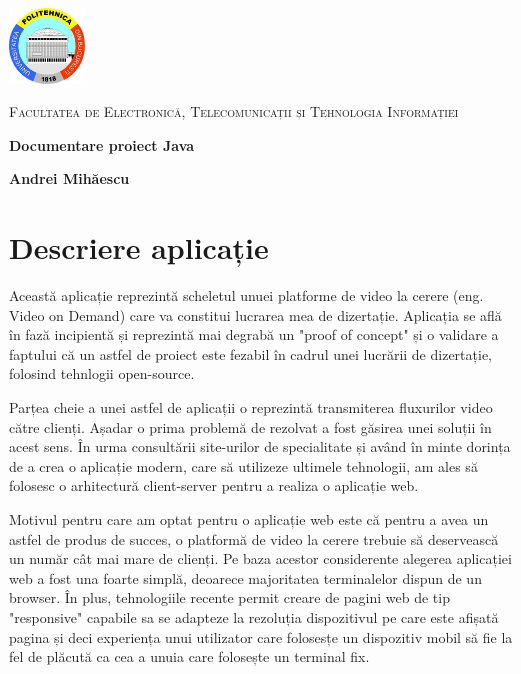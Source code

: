 \documentclass[12pt, a4paper, oneside, romanian]{teza-upb}
\begin{document}
\begin{titlepage}
	\centering
	\includegraphics[width=0.15\textwidth]{img/UPB-logo.png}\par\vspace{1cm}
	{\scshape\LARGE Facultatea de Electronică, Telecomunicații și Tehnologia Informației \par}
	\vspace{1cm}
	{\huge\bfseries Documentare proiect Java\par}
	\vspace{2cm}
	{\Large\bfseries Andrei Mihăescu\par}
	

\end{titlepage}
\newpage

\chapter{Descriere aplicație}	
Această aplicație reprezintă scheletul unuei platforme de video la cerere (eng. Video on Demand) care va constitui lucrarea mea de dizertație. Aplicația se află în fază incipientă și reprezintă mai degrabă un "proof of concept" și o validare a faptului că un astfel de proiect este fezabil în cadrul unei lucrării de dizertație, folosind tehnlogii open-source.

Parțea cheie a unei astfel de aplicații o reprezintă transmiterea fluxurilor video către clienți. Așadar o prima problemă de rezolvat a fost găsirea unei soluții în acest sens. În urma consultării site-urilor de specialitate și având în minte dorința de a crea o aplicație modern, care să utilizeze ultimele tehnologii, am ales să folosesc o arhitectură client-server pentru a realiza o aplicație web. 

Motivul pentru care am optat pentru o aplicație web este că pentru a avea un astfel de produs de succes, o platformă de video la cerere trebuie să deservească un număr cât mai mare de clienți. Pe baza acestor considerente alegerea aplicației web a fost una foarte simplă, deoarece majoritatea terminalelor dispun de un browser. În plus, tehnologiile recente permit creare de pagini web de tip "responsive" capabile sa se adapteze la rezoluția dispozitivul pe care este afișată pagina și deci experiența unui utilizator care folosesțe un dispozitiv mobil să fie la fel de plăcută ca cea a unuia care folosește un terminal fix.
\end{document}
